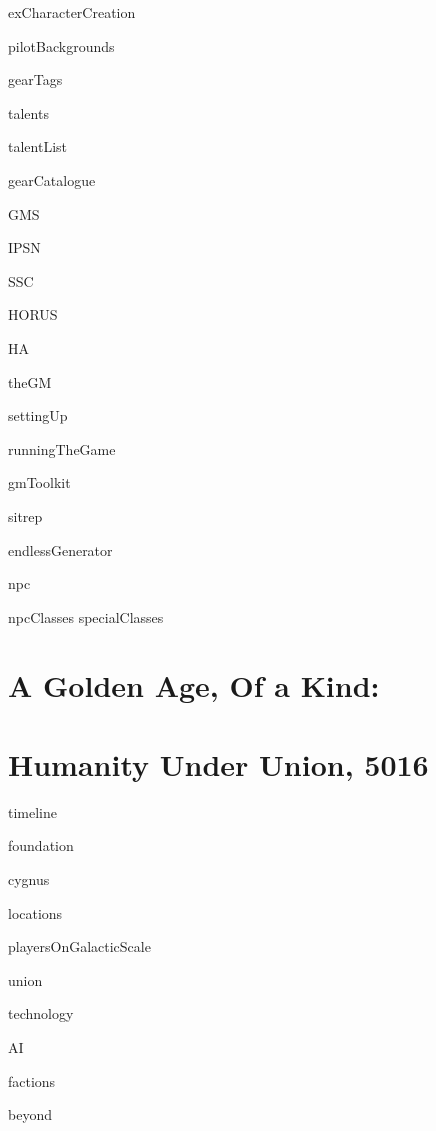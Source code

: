 \documentclass{article}
\begin{document}
{exCharacterCreation}    
\newpage

{pilotBackgrounds}    
\newpage

{gearTags}    
\newpage

{talents}

{talentList}     
\newpage


{gearCatalogue}    
\newpage

{GMS}    
\newpage

{IPSN}    
\newpage

{SSC}    
\newpage

{HORUS}    
\newpage

{HA}    
\newpage

{theGM}    
\newpage

{settingUp}    
\newpage

{runningTheGame}    
\newpage

{gmToolkit}    
\newpage

{sitrep}    
\newpage

{endlessGenerator}    
\newpage

{npc}    
\newpage

{npcClasses}    
\newpage
{specialClasses}    
\newpage
\section{A Golden Age, Of a Kind:}  
\section{Humanity Under Union, 5016} 
\newpage

{timeline}    
\newpage

{foundation}    
\newpage

{cygnus}    
\newpage

{locations}    
\newpage

{playersOnGalacticScale}    
\newpage

{union}    
\newpage

{technology}    
\newpage

{AI}    
\newpage

{factions}    
\newpage

{beyond}    
\newpage
\end{document}

